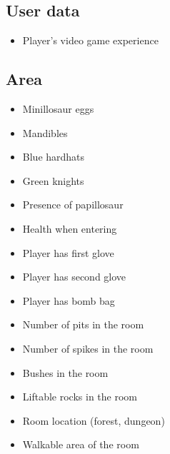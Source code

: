 \documentclass[a4paper]{article}
\begin{document}
\begin{multicols}{2}
\subsection{User data}
\begin{itemize}
\item Player's video game experience
\end{itemize}
\subsection{Area}
\begin{itemize}
\item Minillosaur eggs
\item Mandibles
\item Blue hardhats
\item Green knights
\item Presence of papillosaur
\item Health when entering
\item Player has first glove
\item Player has second glove
\item Player has bomb bag
\item Number of pits in the room
\item Number of spikes in the room
\item Bushes in the room
\item Liftable rocks in the room
\item Room location (forest, dungeon)
\item Walkable area of the room
\end{itemize}

\end{multicols}
\end{document}
